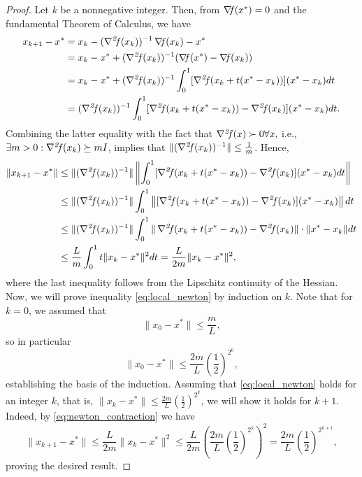 \documentclass[10pt,a4paper]{article}
\begin{document}
\begin{proof}
	Let $k$ be a nonnegative integer. Then, from  $\operatorname*{\mathit{\nabla \!f}}(x^*)=0$ and the fundamental Theorem of Calculus, we have
	\begin{align*}
		x_{k+1} - x^* &= x_k - (\hess(x_k))^{-1} \grad(x_k) - x^* \nonumber \\
		&= x_k - x^* + (\hess(x_k))^{-1}(\grad(x^*) - \grad(x_k)) \nonumber \\
		&= x_k - x^* + (\hess(x_k))^{-1} \int_0^1 [\hess(x_k + t(x^* - x_k))](x^* - x_k) dt \nonumber \\
		&= (\hess(x_k))^{-1} \int_0^1 [\hess(x_k + t(x^* - x_k)) - \hess(x_k)](x^* - x_k) dt. \nonumber
	\end{align*}
	Combining the latter equality with the fact that $\operatorname*{\mathit{\nabla^2 \!f}}(x)\succ 0 \forall x,$ i.e., $\exists m>0: \operatorname*{\mathit{\nabla^2 \!f}}(x_k) \succeq mI$, implies that $\|(\operatorname*{\mathit{\nabla^2 \!f}}(x_k))^{-1}\| \leq \frac{1}{m}$. Hence,
	\begin{align*}
		\|x_{k+1} - x^*\| &\leq \|(\hess(x_k))^{-1}\| \left\| \int_0^1 [\hess(x_k + t(x^* - x_k)) - \hess(x_k)](x^* - x_k) dt \right\| \nonumber \\
		&\leq \|(\hess(x_k))^{-1}\| \int_0^1 \left\| [\hess(x_k + t(x^* - x_k)) - \hess(x_k)](x^* - x_k) \right\| dt \nonumber \\
		&\leq \|(\hess(x_k))^{-1}\| \int_0^1 \|\hess(x_k + t(x^* - x_k)) - \hess(x_k)\| \cdot \|x^* - x_k\| dt \nonumber \\
		&\leq \frac{L}{m} \int_0^1 t \|x_k - x^*\|^2 dt = \frac{L}{2m} \|x_k - x^*\|^2, \nonumber
	\end{align*}
where the last inequality follows from the Lipschitz continuity of the Hessian.	Now, we will prove inequality \eqref{eq:local_newton} by induction on $k$. Note that for $k = 0$, we assumed that
	\begin{equation*}
		\|x_0 - x^*\| \leq \frac{m}{L},
	\end{equation*}	
	so in particular
	\begin{equation*}
		\|x_0 - x^*\| \leq \frac{2m}{L} \left(\frac{1}{2}\right)^{2^0},
	\end{equation*}
	establishing the basis of the induction. Assuming that \eqref{eq:local_newton} holds for an integer $k$, that is, $\|x_k - x^*\| \leq \frac{2m}{L} \left(\frac{1}{2}\right)^{2^k}$, we will show it holds for $k + 1$. Indeed, by \eqref{eq:newton_contraction} we have
	\begin{equation*}
		\|x_{k+1} - x^*\| \leq \frac{L}{2m} \|x_k - x^*\|^2 \leq \frac{L}{2m} \left(\frac{2m}{L} \left(\frac{1}{2}\right)^{2^k}\right)^2 = \frac{2m}{L} \left(\frac{1}{2}\right)^{2^{k+1}},
	\end{equation*}
	proving the desired result.
\end{proof}
\end{document}
